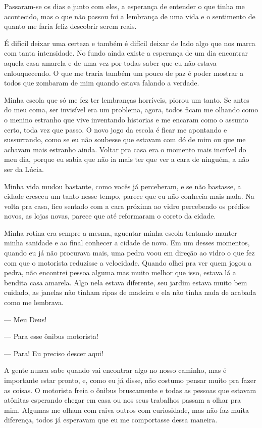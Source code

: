 Passaram-se os dias e junto com eles, a esperança de entender o que tinha me acontecido, mas o que não passou foi a lembrança de uma vida e o sentimento de quanto me faria feliz descobrir serem reais.

É difícil deixar uma certeza e também é difícil deixar de lado algo que nos marca com tanta intensidade. No fundo ainda existe a esperança de um dia encontrar aquela casa amarela e de uma vez por todas saber que eu não estava enlouquecendo. O que me traria também um pouco de paz é poder mostrar a todos que zombaram de mim quando estava falando a verdade.

Minha escola que só me fez ter lembranças horríveis, piorou um tanto. Se antes do meu coma, ser invisível era um problema, agora, todos ficam me olhando como o menino estranho que vive inventando historias e me encaram como o assunto certo, toda vez que passo. O novo jogo da escola é ficar me apontando e sussurrando, como se eu não soubesse que estavam com dó de mim ou que me achavam mais estranho ainda. Voltar pra casa era o momento mais incrível do meu dia, porque eu sabia que não ia mais ter que ver a cara de ninguém, a não ser da Lúcia. 

Minha vida mudou bastante, como vocês já perceberam, e se não bastasse, a cidade cresceu um tanto nesse tempo, parece que eu não conhecia mais nada. Na volta pra casa, fico sentado com a cara próxima ao vidro percebendo os prédios novos, as lojas novas, parece que até reformaram o coreto da cidade. 

Minha rotina era sempre a mesma, aguentar minha escola tentando manter minha sanidade e ao final conhecer a cidade de novo. Em um desses momentos, quando eu já não procurava mais, uma pedra voou em direção ao vidro o que fez com que o motorista reduzisse a velocidade. Quando olhei pra ver quem jogou a pedra, não encontrei pessoa alguma mas muito melhor que isso, estava lá a bendita casa amarela. Algo nela estava diferente, seu jardim estava muito bem cuidado, as janelas não tinham ripas de madeira e ela não tinha nada de acabada como me lembrava.

— Meu Deus!

— Para esse ônibus motorista!

— Para! Eu preciso descer aqui!

A gente nunca sabe quando vai encontrar algo no nosso caminho, mas é importante estar pronto, e, como eu já disse, não costumo pensar muito pra fazer as coisas. O motorista freia o ônibus bruscamente e todas as pessoas que estavam atônitas esperando chegar em casa ou nos seus trabalhos passam a olhar pra mim. Algumas me olham com raiva outros com curiosidade, mas não faz muita diferença, todos já esperavam que eu me comportasse dessa maneira.

